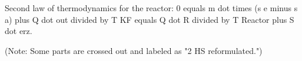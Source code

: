 Second law of thermodynamics for the reactor:  
0 equals m dot times (s e minus s a) plus Q dot out divided by T KF equals Q dot R divided by T Reactor plus S dot erz.  

(Note: Some parts are crossed out and labeled as "2 HS reformulated.")